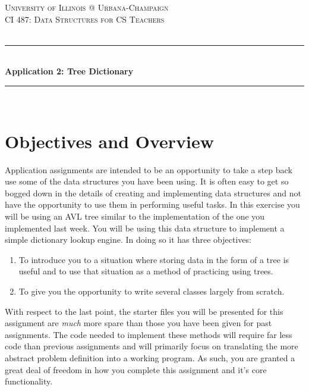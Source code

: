 \documentclass[a4paper]{article}
\begin{document}
\begin{titlepage}

\newcommand{\HRule}{\rule{\linewidth}{0.5mm}} 							%
\center 
 
\textsc{\LARGE University of Illinois @ Urbana-Champaign}\\[1cm]

\textsc{\Large CI 487: Data Structures for CS Teachers}\\[0.2cm]
\textsc{\large }\\[1cm] 										%
\HRule \\[0.8cm]
{\huge \bfseries Application 2: Tree Dictionary}\\[0.7cm]								%
\HRule \\[0.8cm]
\vfill
\vfill 
\end{titlepage}


\section*{Objectives and Overview}

Application assignments are intended to be an opportunity to take a step back
use some of the data structures you have been using. It is often easy to get so
bogged down in the details of creating and implementing data structures and not
have the opportunity to use them in performing useful tasks. In this exercise
you will be using an AVL tree similar to the implementation of the one you
implemented last week. You will be using this data structure to implement
a simple dictionary lookup engine. In doing so it has three objectives:

\begin{enumerate}
    \item To introduce you to a situation where storing data in the form of a tree is useful and to use that situation as a method of practicing using trees.
    \item To give you the opportunity to write several classes largely from scratch.
\end{enumerate}

With respect to the last point, the starter files you will be presented for
this assignment are \textit{much} more spare than those you have been given
for past assignments. The code needed to implement these methods will require
far less code than previous assignments and will primarily focus on translating 
the more abstract problem definition into a working program. As such, you are granted
a great deal of freedom in how you complete this assignment and it's core functionality.
\end{document}
